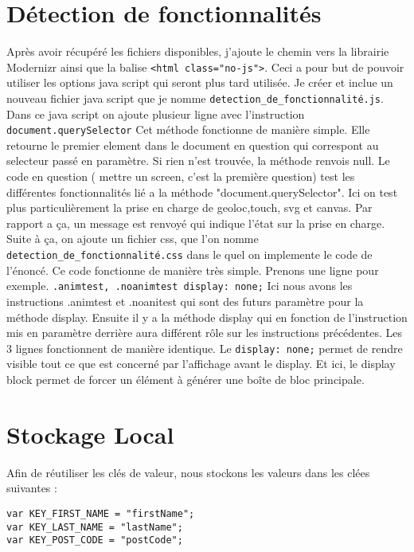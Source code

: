 \section{Détection de fonctionnalités}
Après avoir récupéré les fichiers disponibles, j'ajoute le chemin vers la librairie Modernizr ainsi que la balise \texttt{<html class="no-js">}. Ceci a pour but de pouvoir utiliser les options java script qui seront plus tard utilisée.
Je créer et inclue un nouveau fichier java script que je nomme \texttt{detection_de_fonctionnalité.js}.
Dans ce java script on ajoute plusieur ligne avec l'instruction \texttt{document.querySelector} Cet méthode fonctionne de manière simple. Elle retourne le premier element dans le document en question qui correspont au selecteur passé en paramètre. Si rien n'est trouvée, la méthode renvois null.
Le code en question ( mettre un screen, c'est la première question) test les différentes fonctionnalités lié a la méthode "document.querySelector". Ici on test plus particulièrement la prise en charge de geoloc,touch, svg et canvas. Par rapport a ça, un message est renvoyé qui indique l'état sur la prise en charge.
Suite à ça, on ajoute un fichier css, que l'on nomme \texttt{detection_de_fonctionnalité.css} dans le quel on implemente le code de l'énoncé.
Ce code fonctionne de manière très simple. Prenons une ligne pour exemple.
\texttt{.animtest, .noanimtest {display: none;}} Ici nous avons les instructions .animtest et .noanitest qui sont des futurs paramètre pour la méthode display. Ensuite il y a la méthode display qui en fonction de l'instruction mis en paramètre derrière aura différent rôle sur les instructions précédentes.
Les 3 lignes fonctionnent de manière identique.
Le \texttt{display: none;} permet de rendre visible tout ce que est concerné par l'affichage avant le display.
Et ici, le display block permet de forcer un élément à générer une boîte de bloc principale.

\section{Stockage Local} %

Afin de réutiliser les clés de valeur, nous stockons les valeurs dans les clées suivantes :
\begin{verbatim}
var KEY_FIRST_NAME = "firstName";
var KEY_LAST_NAME = "lastName";
var KEY_POST_CODE = "postCode";
\end{verbatim}

